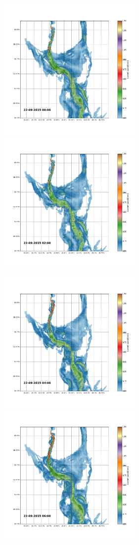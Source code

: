 \documentclass[12pt,a4paper,english]{article}
\begin{document}
\begin{figure}[ht]
\centerline{
\includegraphics*[trim=2.0cm 3cm 6.0cm 3.5cm,clip=true,height=7cm]{Python/stromfelt_82}
\includegraphics*[trim=3.7cm 3cm 1.3cm 3.5cm,clip=true,height=7cm]{Python/stromfelt_84}
}
\centerline{
\includegraphics*[trim=2.0cm 3cm 6.0cm 3.5cm,clip=true,height=7cm]{Python/stromfelt_86}
\includegraphics*[trim=3.7cm 3cm 1.3cm 3.5cm,clip=true,height=7cm]{Python/stromfelt_88}
}
\end{figure}
\end{document}
